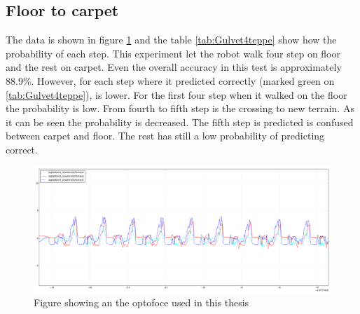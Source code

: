 \documentclass[USenglish]{ifimaster}  %
\begin{document}
\subsection{Floor to carpet}
The data is shown in figure \ref{fig:gulvet4teppegraf} and the table \ref{tab:Gulvet4teppe} show how the probability of each step. This experiment let the robot walk four step on floor and the rest on carpet. Even the overall accuracy in this test is approximately 88.9\%. However, for each step where it predicted correctly (marked green on \ref{tab:Gulvet4teppe}), is lower. For the first four step when it walked on the floor the probability is low. From fourth to fifth step is the crossing to new terrain. As it can be seen the probability is decreased. The fifth step is predicted is confused between carpet and floor. The rest has still a low probability of predicting correct.

\begin{figure}[h]
    \centering
    \includegraphics[width=\textwidth,height=\textheight,keepaspectratio]{Figures/Gulvet4Teppe2}
    \caption{Figure showing an the optofoce used in this thesis \cite{OptoforceFig}}
    \label{fig:gulvet4teppegraf}
\end{figure}


\begin{table}[h]
\centering
{}
\caption{Gulvet4teppe}
\label{tab:Gulvet4teppe}
\end{table}
\FloatBarrier
\end{document}
